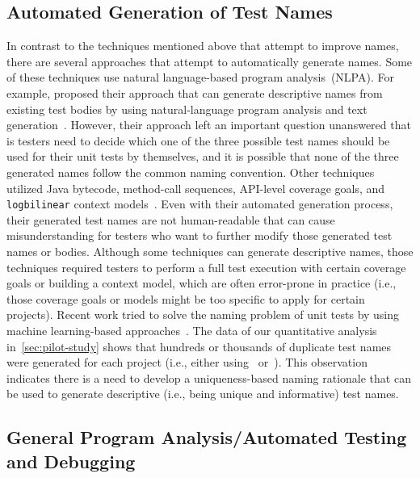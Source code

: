 \subsection{Automated Generation of Test Names}

In contrast to the techniques mentioned above that attempt to improve names, there are several approaches that attempt to automatically generate names.
%
Some of these techniques use natural language-based program analysis~(NLPA).
%
For example, \citeauthor{zhang2016towards} proposed their approach that can generate descriptive names from existing test bodies by using natural-language program analysis and text generation~\cite{zhang2016towards}.
%
However, their approach left an important question unanswered that is testers need to decide which one of the three possible test names should be used for their unit tests by themselves, and it is possible that none of the three generated names follow the common naming convention.
%
Other techniques utilized Java bytecode, method-call sequences, API-level coverage goals, and \texttt{logbilinear} context models~\cite{fraser2011evosuite,thummalapenta2009mseqgen,daka2017generating,allamanis2015suggesting}.
%
Even with their automated generation process, their generated test names are not human-readable that can cause misunderstanding for testers who want to further modify those generated test names or bodies.
Although some techniques can generate descriptive names, those techniques required testers to perform a full test execution with certain coverage goals or building a context model, which are often error-prone in practice (i.e., those coverage goals or models might be too specific to apply for certain projects).
%
Recent work tried to solve the naming problem of unit tests by using machine learning-based approaches~\cite{alon2018code2seq, alon2019code2vec}.
%
The data of our quantitative analysis in~\cref{sec:pilot-study} shows that hundreds or thousands of duplicate test names were generated for each project (i.e., either using~\cite{alon2018code2seq} or~\cite{alon2019code2vec}).
%
This observation indicates there is a need to develop a uniqueness-based naming rationale that can be used to generate descriptive (i.e., being unique and informative) test names.


\subsection{General Program Analysis\slash Automated Testing and Debugging}

